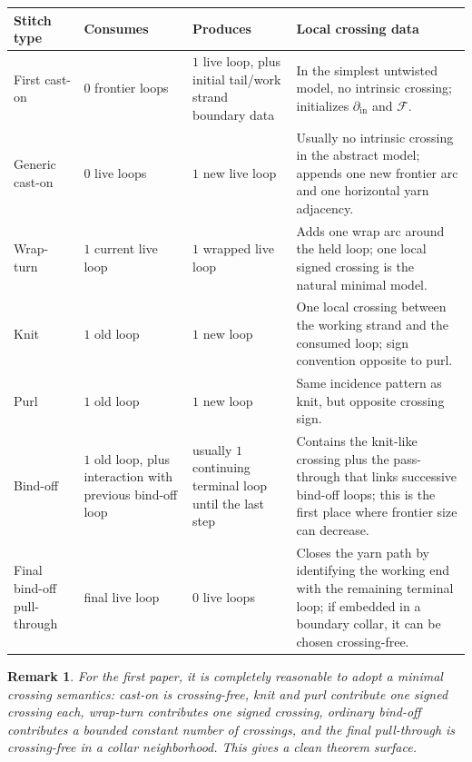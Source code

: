 \documentclass[11pt]{article}
\newtheorem{remark}{Remark}
\newcommand{\Front}{\mathcal{F}}
\begin{document}
\begin{center}
\begin{tabular}{>{\raggedright\arraybackslash}p{1.8in} >{\raggedright\arraybackslash}p{1.2in} >{\raggedright\arraybackslash}p{1.2in} >{\raggedright\arraybackslash}p{2.7in}}
\toprule
Stitch type & Consumes & Produces & Local crossing data \\
\midrule
First cast-on & \(0\) frontier loops & \(1\) live loop, plus initial tail/work strand boundary data & In the simplest untwisted model, no intrinsic crossing; initializes \(\partial_{\mathrm{in}}\) and \(\Front\). \\
Generic cast-on & \(0\) live loops & \(1\) new live loop & Usually no intrinsic crossing in the abstract model; appends one new frontier arc and one horizontal yarn adjacency. \\
Wrap-turn & \(1\) current live loop & \(1\) wrapped live loop & Adds one wrap arc around the held loop; one local signed crossing is the natural minimal model. \\
Knit & \(1\) old loop & \(1\) new loop & One local crossing between the working strand and the consumed loop; sign convention opposite to purl. \\
Purl & \(1\) old loop & \(1\) new loop & Same incidence pattern as knit, but opposite crossing sign. \\
Bind-off & \(1\) old loop, plus interaction with previous bind-off loop & usually \(1\) continuing terminal loop until the last step & Contains the knit-like crossing plus the pass-through that links successive bind-off loops; this is the first place where frontier size can decrease. \\
Final bind-off pull-through & final live loop & \(0\) live loops & Closes the yarn path by identifying the working end with the remaining terminal loop; if embedded in a boundary collar, it can be chosen crossing-free. \\
\bottomrule
\end{tabular}
\end{center}

\begin{remark}
For the first paper, it is completely reasonable to adopt a \emph{minimal crossing semantics}: cast-on is crossing-free, knit and purl contribute one signed crossing each, wrap-turn contributes one signed crossing, ordinary bind-off contributes a bounded constant number of crossings, and the final pull-through is crossing-free in a collar neighborhood. This gives a clean theorem surface.
\end{remark}
\end{document}
